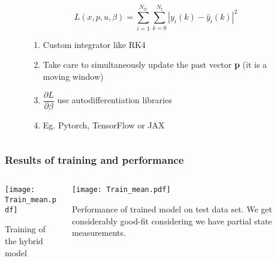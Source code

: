 \documentclass[dvipsnames, 9pt]{beamer}
\begin{document}
\begin{frame}
\begin{columns}
\begin{column}{0.4\textwidth}
\begin{figure}
\begin{alertblock}{}
\begin{equation*}
L(x,p,u,\beta) = \sum_{i=1}^{N_{tr}} \sum_{k=0}^{N_t} |y_i(k) - \hat{y}_i (k)|^2
\end{equation*}
\begin{enumerate}
\scriptsize
\item Custom integrator like RK4
\item Take care to simultaneously update the past vector \textbf{p} (it is a moving window)
\item $\dfrac{\partial L}{\partial \beta}$ use autodifferentiation libraries
\item Eg. Pytorch, TensorFlow or JAX
\end{enumerate}
\end{alertblock}

 \end{figure}
        \end{column}
    \end{columns}
\end{frame}


\begin{frame}
    \frametitle{Results of training and performance}
    
    \begin{columns}
    {   \begin{column}{0.5\textwidth}
        \texttt{[image: Train\_mean.pdf]}
        \begin{center}
        \scriptsize{Training of the hybrid model}
        \end{center}
        \end{column}}
        \begin{column}{0.5\textwidth}
        \vspace{4mm}
        \texttt{[image: Train\_mean.pdf]}
        \begin{center}
        \scriptsize{Performance of trained model on test data set. We get considerably good-fit considering we have partial state measurements.}
        \end{center}
        \end{column}
    \end{columns}
\end{frame}
\end{document}
